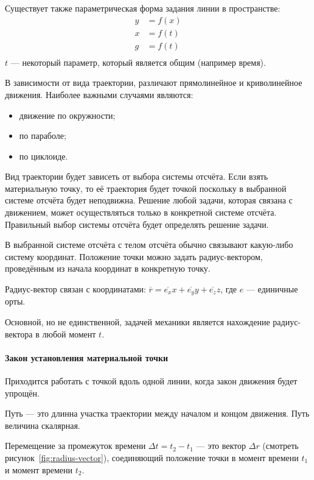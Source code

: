 Существует также параметрическая форма задания линии в пространстве:
\begin{align*}
  y & = f(x) \\
  x & = f(t) \\
  g & = f(t) \\
\end{align*}
\( t \) --- некоторый параметр, который является общим (например время).

В зависимости от вида траектории, различают прямолинейное и криволинейное
движения. Наиболее важными случаями являются:
\begin{itemize}
  \item движение по окружности;
  \item по параболе;
  \item по циклоиде.
\end{itemize}

Вид траектории будет зависеть от выбора системы отсчёта. Если взять
материальную точку, то её траектория будет точкой поскольку в выбранной системе
отсчёта будет неподвижна. Решение любой задачи, которая связана с движением,
может осуществляться только в конкретной системе отсчёта. Правильный выбор
системы отсчёта будет определять решение задачи.

В выбранной системе отсчёта с телом отсчёта обычно связывают какую-либо
систему координат. Положение точки можно задать радиус-вектором,
проведённым из начала координат в конкретную точку.

Радиус-вектор связан с координатами: \( \overline{r} = \overline{e_x} x
+ \overline{e_y} y + \overline{e_z} z \), где $e$ --- единичные орты.

Основной, но не единственной, задачей механики является нахождение
радиус-вектора в любой момент $t$.

\paragraph{Закон установления материальной точки}
Приходится работать с точкой вдоль одной линии, когда закон движения будет
упрощён.

Путь --- это длинна участка траектории между началом и концом движения. Путь
величина скалярная.

Перемещение за промежуток времени \( \Delta t = t_2 - t_1 \) --- это вектор
$\Delta r$ (смотреть рисунок~\ref{fig:radius-vector}), соединяющий положение
точки в момент времени $t_1$ и момент времени $t_2$.

